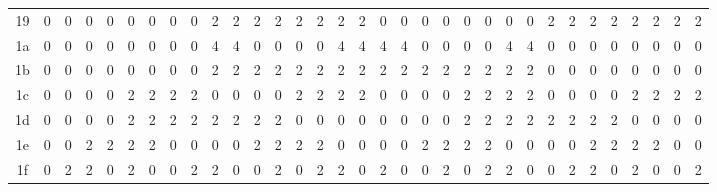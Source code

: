 \documentclass[11pt]{article}
\begin{document}
\begin{table}[htbp]
{\begin{tabular}{c|*{32}{c}}
    19 & 0 & 0 & 0 & 0 & 0 & 0 & 0 & 0 & 2 & 2 & 2 & 2 & 2 & 2 & 2 & 2 & 0 & 0 & 0 & 0 & 0 & 0 & 0 & 0 & 2 & 2 & 2 & 2 & 2 & 2 & 2 & 2 \\
    1a & 0 & 0 & 0 & 0 & 0 & 0 & 0 & 0 & 4 & 4 & 0 & 0 & 0 & 0 & 4 & 4 & 4 & 4 & 0 & 0 & 0 & 0 & 4 & 4 & 0 & 0 & 0 & 0 & 0 & 0 & 0 & 0 \\
    1b & 0 & 0 & 0 & 0 & 0 & 0 & 0 & 0 & 2 & 2 & 2 & 2 & 2 & 2 & 2 & 2 & 2 & 2 & 2 & 2 & 2 & 2 & 2 & 2 & 0 & 0 & 0 & 0 & 0 & 0 & 0 & 0 \\
    1c & 0 & 0 & 0 & 0 & 2 & 2 & 2 & 2 & 0 & 0 & 0 & 0 & 2 & 2 & 2 & 2 & 0 & 0 & 0 & 0 & 2 & 2 & 2 & 2 & 0 & 0 & 0 & 0 & 2 & 2 & 2 & 2 \\
    1d & 0 & 0 & 0 & 0 & 2 & 2 & 2 & 2 & 2 & 2 & 2 & 2 & 0 & 0 & 0 & 0 & 0 & 0 & 0 & 0 & 2 & 2 & 2 & 2 & 2 & 2 & 2 & 2 & 0 & 0 & 0 & 0 \\
    1e & 0 & 0 & 2 & 2 & 2 & 2 & 0 & 0 & 0 & 0 & 2 & 2 & 2 & 2 & 0 & 0 & 0 & 0 & 2 & 2 & 2 & 2 & 0 & 0 & 0 & 0 & 2 & 2 & 2 & 2 & 0 & 0 \\
    1f & 0 & 2 & 2 & 0 & 2 & 0 & 0 & 2 & 2 & 0 & 0 & 2 & 0 & 2 & 2 & 0 & 2 & 0 & 0 & 2 & 0 & 2 & 2 & 0 & 0 & 2 & 2 & 0 & 2 & 0 & 0 & 2 \\
    \bottomrule
\end{tabular}
}
\end{table}
\end{document}
